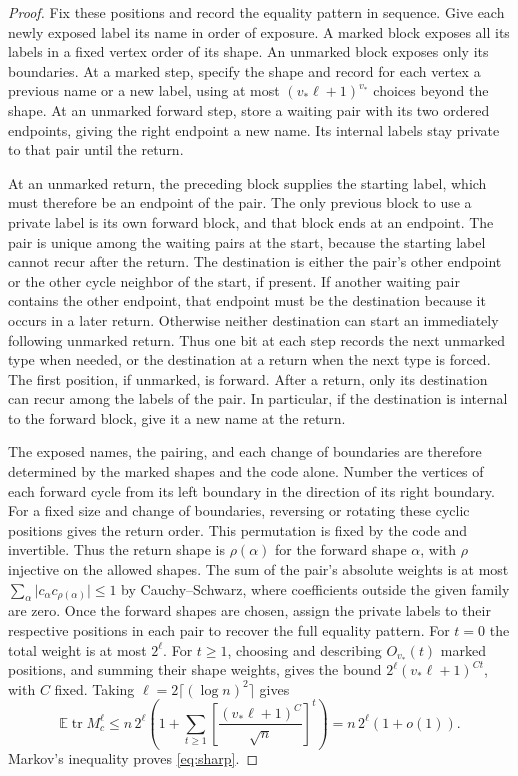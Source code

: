 \documentclass[11pt,letterpaper]{article}
\newcommand{\E}{\mathbb E}
\newcommand{\tr}{\operatorname{tr}}
\newcommand{\abs}[1]{\lvert #1\rvert}
\begin{document}
\begin{proof}
Fix these positions and record the equality pattern in sequence.
Give each newly exposed label its name in order of exposure. A marked
block exposes all its labels in a fixed vertex order of its shape.
An unmarked block exposes only its boundaries. At a marked step,
specify the shape and record for each vertex a previous name or a
new label, using at most \((v_\ast\ell+1)^{v_\ast}\) choices beyond the
shape. At an unmarked forward step, store a waiting pair with its two ordered
endpoints, giving the right endpoint a new name. Its internal labels
stay private to that pair until the return.

At an unmarked return, the preceding block supplies the starting
label, which must therefore be an endpoint of the pair. The only
previous block to use a private label is its own forward block, and
that block ends at an endpoint. The pair is unique among the waiting
pairs at the start, because the starting label cannot recur after
the return.
The destination is either the pair's other endpoint or the other
cycle neighbor of the start, if present. If another waiting pair
contains the other endpoint, that endpoint must be the destination
because it occurs in a later return. Otherwise neither destination
can start an immediately following unmarked return. Thus one bit at
each step records the next unmarked type when needed, or the
destination at a return when the next type is forced. The first
position, if unmarked, is forward. After a return, only its
destination can recur among the labels of the pair. In particular,
if the destination is internal to the forward block, give it a new
name at the return.

The exposed names, the pairing, and each change of boundaries are
therefore determined by the marked shapes and the code alone. Number
the vertices of each forward cycle from its left boundary in the
direction of its right boundary. For a fixed size and change of
boundaries, reversing or rotating these cyclic positions gives the
return order. This permutation is fixed by the code and invertible.
Thus the return shape is \(\rho(\alpha)\) for the forward shape
\(\alpha\), with \(\rho\) injective on the allowed shapes. The sum of
the pair's absolute weights is at most
\(\sum_\alpha\abs{c_\alpha c_{\rho(\alpha)}}\le1\) by Cauchy--Schwarz,
where coefficients outside the given family are zero. Once the
forward shapes are chosen, assign the private labels to their
respective positions in each pair to recover the full equality
pattern. For \(t=0\) the total weight is at most
\(2^\ell\). For \(t\ge1\), choosing and describing \(O_{v_\ast}(t)\) marked
positions, and summing their shape weights, gives the bound
\(2^\ell(v_\ast\ell+1)^{C t}\), with \(C\) fixed. Taking
\(\ell=2\lceil(\log n)^2\rceil\) gives
\[
 \E\tr M_c^\ell\le n\,2^\ell
    \left(1+\sum_{t\ge1}\left[\frac{(v_\ast\ell+1)^C}{\sqrt n}\right]^t\right)
    =n\,2^\ell(1+o(1)).
\]
Markov's inequality proves \eqref{eq:sharp}.
\end{proof}
\end{document}

